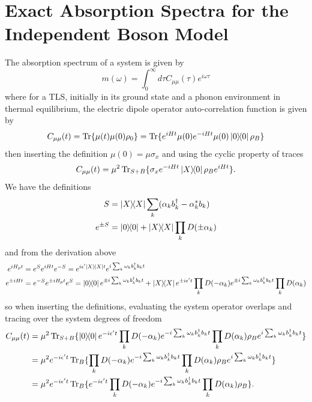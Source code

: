 \documentclass[]{article}
\begin{document}
\section{Exact Absorption Spectra for the Independent Boson Model}
The absorption spectrum of a system is given by
\begin{equation}
m(\omega) = \int_{0}^{\infty}d\tau C_{\mu \mu}(\tau)e^{i\omega\tau}
\end{equation}
where for a TLS, initially in its ground state and a phonon environment in thermal equilibrium, the electric dipole operator auto-correlation function is given by 
\begin{equation}
C_{\mu \mu}(t) = \Tr\{\mu(t)\mu(0)\rho_0\} = \Tr\{e^{iHt}\mu(0) e^{-iHt}\mu(0)\dyad{0}\rho_{B}\}
\end{equation}
then inserting the definition $\mu(0) = \mu\sigma_x$ and using the cyclic property of traces
\begin{equation}
C_{\mu \mu}(t) =  \mu^2\Tr_{S+B}\{\sigma_x e^{-iHt}\dyad{X}{0}\rho_{B}e^{iHt}\}.
\end{equation}
We have the definitions
\begin{equation}
\begin{split}
S &= \dyad{X}\sum_k(\alpha_kb_k^{\dagger}-\alpha_k^{*} b_k) \\
e^{\pm S} &= \dyad{0}+\dyad{X}\prod_kD(\pm \alpha_k)
\end{split}
\end{equation}
and from the derivation above 
\begin{equation}
\begin{split}
e^{i H_p t} &= e^{S} e^{i H t} e^{-S} = e^{i \epsilon^{\prime} \dyad{X}t} e^{i\sum_k \omega_k b_k^{\dagger}b_k t} \\
e^{\pm i H t} &= e^{-S} e^{\pm i H_p t} e^{S} = \dyad{0}e^{\pm i\sum_k \omega_k b_k^{\dagger}b_k t} +\dyad{X}e^{\pm i \epsilon^{\prime}t}\prod_k D(- \alpha_k) e^{\pm i\sum_k \omega_k b_k^{\dagger}b_k t} \prod_k D(\alpha_k)
\end{split}
\end{equation}
so when inserting the definitions, evaluating the system operator overlaps and tracing over the system degrees of freedom
\begin{equation}
\begin{split}
C_{\mu \mu}(t) &=  \mu^2\Tr_{S+B}\{ \dyad{0}{0}e^{- i \epsilon^{\prime}t}\prod_k D(- \alpha_k) e^{- i\sum_k \omega_k b_k^{\dagger}b_k t} \prod_k D(\alpha_k)\rho_{B} e^{ i\sum_k \omega_k b_k^{\dagger}b_k t}\} \\
&=  \mu^2 e^{- i \epsilon^{\prime}t}\Tr_{B}\{\prod_k D(- \alpha_k) e^{- i\sum_k \omega_k b_k^{\dagger}b_k t} \prod_k D(\alpha_k)\rho_{B} e^{ i\sum_k \omega_k b_k^{\dagger}b_k t}\} \\
&=  \mu^2 e^{- i \epsilon^{\prime}t}\Tr_{B}\{e^{- i \epsilon^{\prime}t}\prod_k D(- \alpha_k) e^{- i\sum_k \omega_k b_k^{\dagger}b_k t} \prod_k D(\alpha_k)\rho_{B} \}.
\end{split}
\end{equation}
\end{document}
